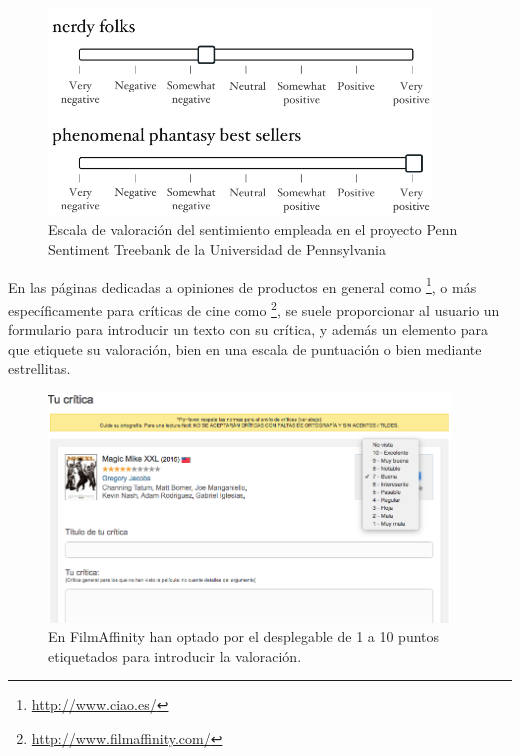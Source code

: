 \begin{figure}[htbp]
\centering
\includegraphics[height=5.5cm]{tramos-polaridad}
\caption[Escala de valoración del sentimiento en Penn Sentiment Treebank]{Escala de valoración del sentimiento empleada en el proyecto Penn Sentiment Treebank de la Universidad de Pennsylvania \citep{Socher2014}}
\label{fig:tramos-polaridad}
\end{figure}


En las páginas dedicadas a opiniones de productos en general como \footnote{\url{http://www.ciao.es/}}, o más específicamente para críticas de cine como \footnote{\url{http://www.filmaffinity.com/}}, se suele proporcionar al usuario un formulario para introducir un texto con su crítica, y además un elemento para que etiquete su valoración, bien en una escala de puntuación o bien mediante estrellitas.

\begin{figure}[htbp]
\centering
\includegraphics[width=0.95\textwidth]{filmaffinity}
\caption[Introducción de la valoración en FilmAffinity]{En FilmAffinity han optado por el desplegable de 1 a 10 puntos etiquetados para introducir la valoración.}
\label{fig:filmaffinity}
\end{figure}


